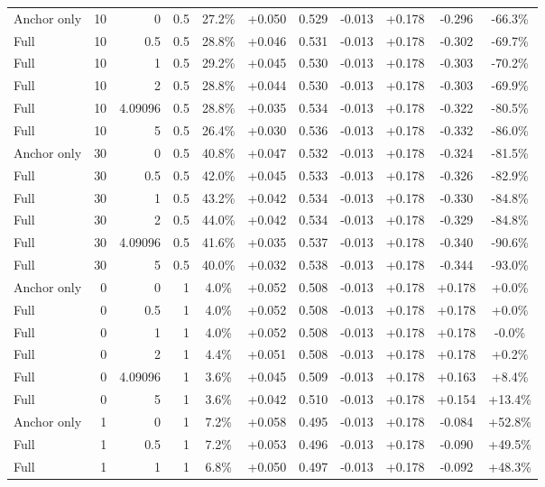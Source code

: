 \begin{table}[htbp]
\begin{tabular}{lrrrccccccc}
Anchor only & 10 & 0 & 0.5 & 27.2\% & +0.050 & 0.529 & -0.013 & +0.178 & -0.296 & -66.3\% \\
Full & 10 & 0.5 & 0.5 & 28.8\% & +0.046 & 0.531 & -0.013 & +0.178 & -0.302 & -69.7\% \\
Full & 10 & 1 & 0.5 & 29.2\% & +0.045 & 0.530 & -0.013 & +0.178 & -0.303 & -70.2\% \\
Full & 10 & 2 & 0.5 & 28.8\% & +0.044 & 0.530 & -0.013 & +0.178 & -0.303 & -69.9\% \\
Full & 10 & 4.09096 & 0.5 & 28.8\% & +0.035 & 0.534 & -0.013 & +0.178 & -0.322 & -80.5\% \\
Full & 10 & 5 & 0.5 & 26.4\% & +0.030 & 0.536 & -0.013 & +0.178 & -0.332 & -86.0\% \\
Anchor only & 30 & 0 & 0.5 & 40.8\% & +0.047 & 0.532 & -0.013 & +0.178 & -0.324 & -81.5\% \\
Full & 30 & 0.5 & 0.5 & 42.0\% & +0.045 & 0.533 & -0.013 & +0.178 & -0.326 & -82.9\% \\
Full & 30 & 1 & 0.5 & 43.2\% & +0.042 & 0.534 & -0.013 & +0.178 & -0.330 & -84.8\% \\
Full & 30 & 2 & 0.5 & 44.0\% & +0.042 & 0.534 & -0.013 & +0.178 & -0.329 & -84.8\% \\
Full & 30 & 4.09096 & 0.5 & 41.6\% & +0.035 & 0.537 & -0.013 & +0.178 & -0.340 & -90.6\% \\
Full & 30 & 5 & 0.5 & 40.0\% & +0.032 & 0.538 & -0.013 & +0.178 & -0.344 & -93.0\% \\
Anchor only & 0 & 0 & 1 & 4.0\% & +0.052 & 0.508 & -0.013 & +0.178 & +0.178 & +0.0\% \\
Full & 0 & 0.5 & 1 & 4.0\% & +0.052 & 0.508 & -0.013 & +0.178 & +0.178 & +0.0\% \\
Full & 0 & 1 & 1 & 4.0\% & +0.052 & 0.508 & -0.013 & +0.178 & +0.178 & -0.0\% \\
Full & 0 & 2 & 1 & 4.4\% & +0.051 & 0.508 & -0.013 & +0.178 & +0.178 & +0.2\% \\
Full & 0 & 4.09096 & 1 & 3.6\% & +0.045 & 0.509 & -0.013 & +0.178 & +0.163 & +8.4\% \\
Full & 0 & 5 & 1 & 3.6\% & +0.042 & 0.510 & -0.013 & +0.178 & +0.154 & +13.4\% \\
Anchor only & 1 & 0 & 1 & 7.2\% & +0.058 & 0.495 & -0.013 & +0.178 & -0.084 & +52.8\% \\
Full & 1 & 0.5 & 1 & 7.2\% & +0.053 & 0.496 & -0.013 & +0.178 & -0.090 & +49.5\% \\
Full & 1 & 1 & 1 & 6.8\% & +0.050 & 0.497 & -0.013 & +0.178 & -0.092 & +48.3\% \\

\end{tabular}
\end{table}
